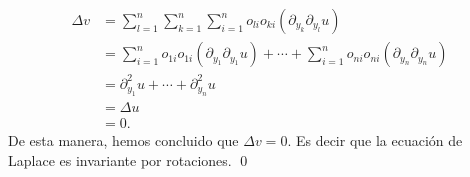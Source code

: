 \documentclass{article}
\begin{document}
\begin{homeworkProblem}[3]
\begin{solucion}
        \begin{align*}
            \Delta v&=\sum_{l=1}^n\sum_{k=1}^n\sum_{i=1}^no_{li}o_{ki}(\partial_{y_k}\partial_{y_l}u)\\
            &=\sum_{i=1}^no_{1i}o_{1i}(\partial_{y_1}\partial_{y_1}u)+\cdots+\sum_{i=1}^no_{ni}o_{ni}(\partial_{y_n}\partial_{y_n}u)\\
            &=\partial_{y_1}^2u+\cdots+\partial_{y_n}^2u\\
            &=\Delta u\\&=0.
        \end{align*}
        De esta manera, hemos concluido que $\Delta v=0.$ Es decir que la ecuación de Laplace es invariante por rotaciones.
        \qed
    \end{solucion}
\end{homeworkProblem}
\newpage
\end{document}
